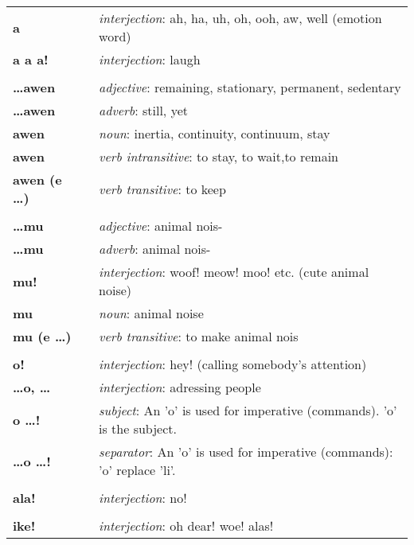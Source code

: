 \begin{supertabular}{p{2,5cm}|ll}
\textbf{a} && \textit{interjection}: ah, ha, uh, oh, ooh, aw, well (emotion word) \\ %
\textbf{a a a!} && \textit{interjection}: laugh \\ %
 && \\ %
\textbf{\dots awen} && \textit{adjective}: remaining, stationary, permanent, sedentary \\ %
\textbf{\dots awen} && \textit{adverb}: still, yet \\ %
\textbf{awen} && \textit{noun}: inertia, continuity, continuum, stay \\ %
\textbf{awen} && \textit{verb intransitive}: to stay, to wait,to remain \\ %
\textbf{awen (e \dots)} && \textit{verb transitive}: to keep \\ %
 && \\ %
\textbf{\dots mu} && \textit{adjective}: animal nois- \\ %
\textbf{\dots mu} && \textit{adverb}: animal nois- \\ %
\textbf{mu!} && \textit{interjection}: woof! meow! moo! etc. (cute animal noise) \\ %
\textbf{mu} && \textit{noun}: animal noise \\ %
\textbf{mu (e \dots)} && \textit{verb transitive}: to make animal nois \\ %
 && \\ %
\textbf{o!} && \textit{interjection}: hey! (calling somebody's attention) \\ %
\textbf{\dots o, \dots} && \textit{interjection}: adressing people \\ %
\textbf{o \dots !} && \textit{subject}: An 'o' is used for imperative (commands). 'o' is the subject.  \\ %
\textbf{\dots o \dots !} && \textit{separator}: An 'o' is used for imperative (commands): 'o' replace 'li'. \\ %
 && \\ %
\textbf{ala!} && \textit{interjection}: no! \\ %
 && \\ %
\textbf{ike!} && \textit{interjection}: oh dear! woe! alas! \\ %

\end{supertabular}

